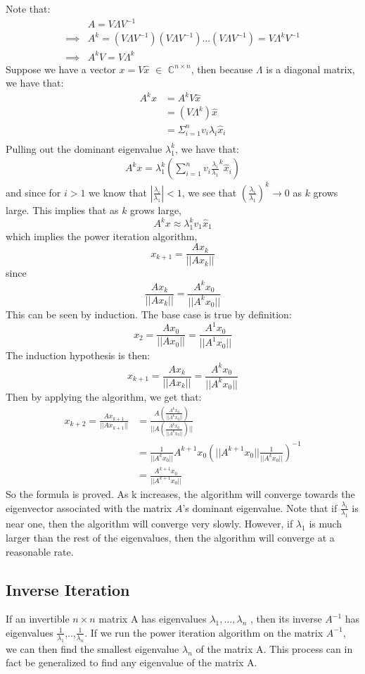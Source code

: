 \documentclass[11pt]{amsart}
\begin{document}
Note that: 
\begin{align*}
	&A = V\Lambda V^{-1} \\
	\implies &A^k = (V\Lambda V^{-1})(V\Lambda V^{-1})...(V\Lambda V^{-1}) = V\Lambda ^k V^{-1} \\	
	\implies &A^kV = V\Lambda ^k
\end{align*}
Suppose we have a vector $x = V \hat{x} $ $\in$ $\mathbb{C}^{n \times n}$, then because $\Lambda$ is a diagonal matrix, we have that:
\begin{align*}
	A^kx &= A^kV\hat{x} \\
	& = (V\Lambda ^k)\hat{x}  \\
	& = \Sigma^{n}_{i=1} v_i \lambda_i \hat{x}_i \\
\end{align*}
Pulling out the dominant eigenvalue $\lambda_1^k$, we have that:
\begin{align*}
	A^kx = \lambda_1^k(\sum_{i=1}^n v_i \frac{\lambda_i}{\lambda_1}^k \hat{x}_i)
\end{align*}
and since for $i > 1$ we know that $|\frac{\lambda_i}{\lambda_1}| < 1$, we see that $(\frac{\lambda_i}{\lambda_1})^k \rightarrow 0$ as $k$ grows large.
This implies that as $k$ grows large, 
\[ 
	A^k x \approx \lambda_1^k v_1 \hat{x}_1
\]
which implies the power iteration algorithm,
\[
	x_{k+1} = \frac{Ax_k}{||Ax_k||}
\]
since
\[
	\frac{Ax_k}{||Ax_k||} = \frac{A^kx_0}{||A^kx_0||}
\]
This can be seen by induction.
The base case is true by definition:
\[
	x_2 = \frac{Ax_0}{||Ax_0||} = \frac{A^1x_0}{||A^1x_0||}
\]
The induction hypothesis is then:
\[
	x_{k+1} = \frac{Ax_k}{||Ax_k||} = \frac{A^kx_0}{||A^kx_0||}
\]
Then by applying the algorithm, we get that:
\begin{align*}
	x_{k+2} = \frac{Ax_{k+1}}{||Ax_{k+1}||} &= \frac{A(\frac{A^kx_0}{||A^kx_0||})}{||A(\frac{A^kx_0}{||A^kx_0||})||}\\
	&= \frac{1}{||A^kx_0||}A^{k+1}x_0(||A^{k+1}x_0||\frac{1}{||A^kx_0||})^{-1} \\
	&=\frac{A^{k+1}x_0}{||A^{k+1}x_0||}
\end{align*}
So the formula is proved. As k increases, the algorithm will converge towards the eigenvector associated with the matrix $A$'s dominant eigenvalue. Note that if $\frac{\lambda_i}{\lambda_1}$ is near one, then the algorithm will converge very slowly. However, if $\lambda_1$ is much larger than the rest of the eigenvalues, then the algorithm will converge at a reasonable rate. 

\subsection{Inverse Iteration}
If an invertible $n\times n$ matrix A has eigenvalues $\lambda_1,...,\lambda_n$ , then its inverse $A^{-1}$ has eigenvalues $\frac{1}{\lambda_1}$,..,$\frac{1}{\lambda_n}$. If we run the power iteration algorithm on the matrix $A^{-1}$, we can then find the smallest eigenvalue $\lambda_n$ of the matrix A. This process can in fact be generalized to find any eigenvalue of the matrix A.
\end{document}
